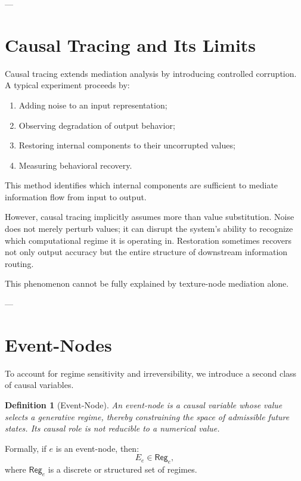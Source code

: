 \documentclass[11pt]{article}
\newtheorem{definition}{Definition}
\theoremstyle{remark}
\newcommand{\Reg}{\mathsf{Reg}}
\begin{document}
---

\section{Causal Tracing and Its Limits}

Causal tracing extends mediation analysis by introducing controlled corruption. A typical experiment proceeds by:
\begin{enumerate}
\item Adding noise to an input representation;
\item Observing degradation of output behavior;
\item Restoring internal components to their uncorrupted values;
\item Measuring behavioral recovery.
\end{enumerate}

This method identifies which internal components are sufficient to mediate information flow from input to output.

However, causal tracing implicitly assumes more than value substitution. Noise does not merely perturb values; it can disrupt the system's ability to recognize which computational regime it is operating in. Restoration sometimes recovers not only output accuracy but the entire structure of downstream information routing.

This phenomenon cannot be fully explained by texture-node mediation alone.

---

\section{Event-Nodes}

To account for regime sensitivity and irreversibility, we introduce a second class of causal variables.

\begin{definition}[Event-Node]
An \emph{event-node} is a causal variable whose value selects a generative regime, thereby constraining the space of admissible future states. Its causal role is not reducible to a numerical value.
\end{definition}

Formally, if \(e\) is an event-node, then:
\[
E_e \in \Reg_e,
\]
where \(\Reg_e\) is a discrete or structured set of regimes.
\end{document}
